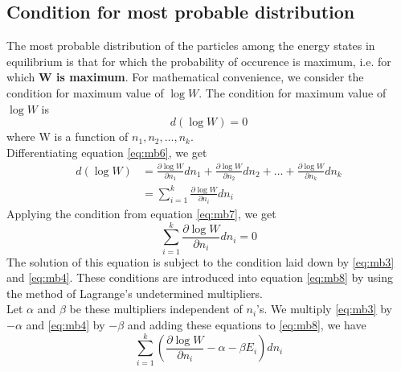 \documentclass{article}
\numberwithin{equation}{section}
\begin{document}
\subsection{Condition for most probable distribution}
The most probable distribution of the particles among the energy states in equilibrium is that for which the probability of occurence is maximum, i.e. for which \textbf{W is maximum}. For mathematical convenience, we consider the condition for maximum value of $\log W$. The condition for maximum value of $\log W$ is
\begin{equation}
  d(\log W) = 0 \label{eq:mb7}
\end{equation}
where W is a function of $n_1,n_2,\dots,n_k$.\\
Differentiating equation \eqref{eq:mb6}, we get
\begin{align*}
  d(\log W) &= \frac{\partial \log W}{\partial n_1}dn_1 + \frac{\partial \log W}{\partial n_2}dn_2 + \dots + \frac{\partial \log W}{\partial n_k}dn_k\\
  &= \sum_{i=1}^{k} \frac{\partial \log W}{\partial n_i}dn_i
\end{align*}
Applying the condition from equation \eqref{eq:mb7}, we get
\begin{equation}
  \sum_{i=1}^{k} \frac{\partial \log W}{\partial n_i}dn_i = 0 \label{eq:mb8}
\end{equation}
The solution of this equation is subject to the condition laid down by \eqref{eq:mb3} and \eqref{eq:mb4}. These conditions are introduced into equation \eqref{eq:mb8} by using the method of Lagrange's undetermined multipliers.\\
Let $\alpha$ and $\beta$ be these multipliers independent of $n_i$'s. We multiply \eqref{eq:mb3} by $-\alpha$ and \eqref{eq:mb4} by $-\beta$ and adding these equations to \eqref{eq:mb8}, we have
\begin{equation}
  \sum_{i=1}^{k}\left(\frac{\partial \log W}{\partial n_i} - \alpha - \beta E_i\right)dn_i \label{eq:mb9}
\end{equation}
\end{document}
